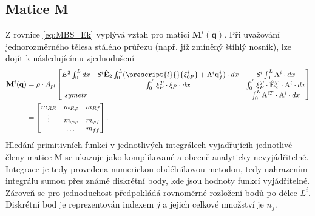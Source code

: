 \subsection{Matice M}
Z rovnice \ref{eq:MBS_Ek} vyplývá vztah pro matici $ \mathbf{M}^i(\mathbf{q}) $. Při uvažování jednorozměrného tělesa stálého průřezu (např. jíž zmíněný štíhlý nosník), lze dojít k následujícímu zjednodušení
\begin{align}
	\mathbf{M}^i(\mathbf{q}) 
	&= \rho \cdot A_{pl} 
	\begin{bmatrix}
		E^2 \int_0^L dx & \mathrm{S}^{i}  \mathbf{\hat{E}}_2 \int_0^L (\prescript{l}{}{\mathbf{\xi}^i_{0P}}  + \mathrm{A}^i \mathbf{q}_f^i) \cdot dx & \mathrm{S}^{i} \int_0^L \mathrm{A}^i \cdot dx \\ 
		& \int_0^L\xi_P^T \cdot \xi_P \cdot dx & \int_0^L \xi_P^T \cdot \mathbf{\hat{E}}_2^T \cdot \mathrm{A}^i\cdot dx \\ 
		symetr &  & \int_0^L \mathrm{A}^{iT} \cdot \mathrm{A}^i \cdot dx
	\end{bmatrix} \notag\\
	&= 
	\begin{bmatrix}
		m_{RR} & m_{R\varphi} & m_{Rf} \\ 
		\vdots& m_{\varphi\varphi} & m_{\varphi f} \\ 
		& \dots & m_{ff}
	\end{bmatrix} .
\end{align}
Hledání primitivních funkcí v jednotlivých integrálech vyjadřujícíh jednotlivé členy matice M se ukazuje jako komplikované a obecně analyticky nevyjádřitelné. Integrace je tedy provedena numerickou obdélníkovou metodou, tedy nahrazením integrálu sumou přes známé diskrétní body, kde jsou hodnoty funkcí vyjádřitelné. Zároveň se pro jednoduchost předpokládá rovnoměrné rozložení bodů po délce $ L^i $. Diskrétní bod je reprezentován indexem $ j $ a jejich celkové množství je $ n_j $. 

